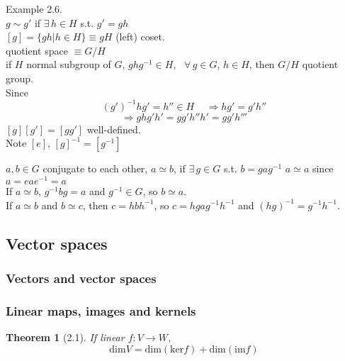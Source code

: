 \documentclass[twoside]{amsart}
\newtheorem{theorem}{Theorem}
\newcommand{\exercisehead}[1]
  {\smallskip
   \noindent{\large\bf Exercise #1.}
   }
\begin{document}
Example 2.6. \\
$g \sim g'$ if $\exists \, h \in H$ s.t. $g' = gh$ \\
$[g] = \lbrace gh | h \in H \rbrace \equiv gH$ (left) coset. \\
quotient space $\equiv G/H$ \\
if $H$ normal subgroup of $G$, $ghg^{-1} \in H$, \, $\forall \, g \in G$, $h \in H$, then $G/H$ quotient group.  \\
Since
\[
(g')^{-1} h g' = h'' \in H \quad \, \Longrightarrow hg' = g'h''
\]
\[
\Longrightarrow ghg'h' = gg' h'' h' = gg'h'''
\]
$[g][g'] = [gg']$ well-defined.  \\

Note $[e]$, $[g]^{-1} = [g^{-1}]$

\exercisehead{2.7} $a,b \in G$ conjugate to each other, $a\simeq b$, if $\exists \, g \in G$ s.t. $b = gag^{-1}$
$a\simeq a$ since $a = eae^{-1} = a$ \\
If $a\simeq b$, $g^{-1}bg = a$ and $g^{-1} \in G$, so $b\simeq a$. \\
If $a \simeq b$ and $b\simeq c$, then $c = hbh^{-1}$, so $c = hg a g^{-1} h^{-1}$ and $(hg)^{-1} = g^{-1}h^{-1}$.  


\subsection{Vector spaces}

\subsubsection{Vectors and vector spaces}

\subsubsection{Linear maps, images and kernels}

\begin{theorem}[2.1] If linear $f: V \to W$, 
\[
\text{dim}{V} = \text{dim}{ (\text{ker}{f}) } + \text{dim}{ (\text{im}{f} ) }
\]
\end{theorem}
\end{document}
